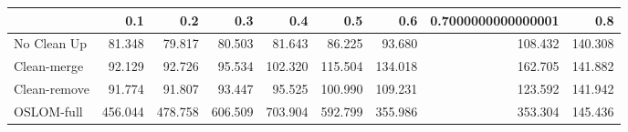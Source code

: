 \begin{tabular}{lrrrrrrrr}
\toprule
{} &     0.1 &     0.2 &     0.3 &     0.4 &     0.5 &     0.6 & 0.7000000000000001 &     0.8 \\
\midrule
No Clean Up  &  81.348 &  79.817 &  80.503 &  81.643 &  86.225 &  93.680 &            108.432 & 140.308 \\
Clean-merge  &  92.129 &  92.726 &  95.534 & 102.320 & 115.504 & 134.018 &            162.705 & 141.882 \\
Clean-remove &  91.774 &  91.807 &  93.447 &  95.525 & 100.990 & 109.231 &            123.592 & 141.942 \\
OSLOM-full   & 456.044 & 478.758 & 606.509 & 703.904 & 592.799 & 355.986 &            353.304 & 145.436 \\
\bottomrule
\end{tabular}
